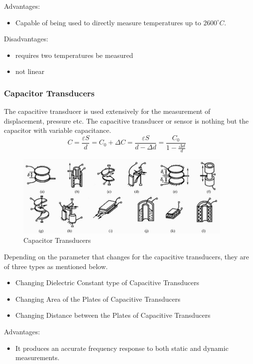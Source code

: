 Advantages:
\begin{itemize}
  \item Capable of being used to directly measure temperatures up to $2600^{\circ}C$.
\end{itemize}

Disadvantages:
\begin{itemize}
  \item requires two temperatures be measured
  \item not linear
\end{itemize}

\subsubsection{Capacitor Transducers}
The capacitive transducer is used extensively for the measurement of displacement, pressure etc. The capacitive transducer or sensor is nothing but the capacitor with variable capacitance.
$$C=\frac{\varepsilon S}{d}=C_0+\Delta C = \frac{\varepsilon S}{d-\Delta d}=\frac{C_0}{1-\frac{\Delta d}{d}}$$

\begin{figure}
  \centering
  \includegraphics[width=4.2in]{fig/fig_capacitor.jpg}
  \caption{Capacitor Transducers}\label{fig_capacitor}
\end{figure}

Depending on the parameter that changes for the capacitive transducers, they are of three types as mentioned below.
\begin{itemize}
  \item Changing Dielectric Constant type of Capacitive Transducers
  \item Changing Area of the Plates of Capacitive Transducers
  \item Changing Distance between the Plates of Capacitive Transducers
\end{itemize}

Advantages:
\begin{itemize}
  \item It produces an accurate frequency response to both static and dynamic measurements.
\end{itemize}

